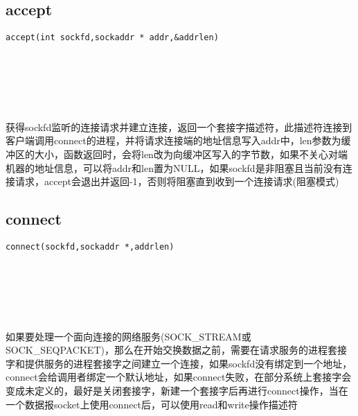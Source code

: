\documentclass[10pt,a4paper]{article}
\begin{document}
\subsection{accept}
\begin{spacing}{2.0}
\lstset{language=C,numbers=none}
\begin{lstlisting}
accept(int sockfd,sockaddr * addr,&addrlen)
\end{lstlisting}
{\large\color[rgb]{0.2,0.4,0.6}{sockfd:}} \\
{\large\color[rgb]{0.2,0.4,0.6}{addr:}} \\
{\large\color[rgb]{0.2,0.4,0.6}{\&addrlen:}}
\paragraph{ \ \ }获得sockfd监听的连接请求并建立连接，返回一个套接字描述符，此描述符连接到客户端调用connect的进程，并将请求连接端的地址信息写入addr中，len参数为缓冲区的大小，函数返回时，会将len改为向缓冲区写入的字节数，如果不关心对端机器的地址信息，可以将addr和len置为NULL，如果sockfd是非阻塞且当前没有连接请求，accept会退出并返回-1，否则将阻塞直到收到一个连接请求(阻塞模式)
\end{spacing}

\subsection{connect}
\begin{spacing}{2.0}
\lstset{language=C,numbers=none}
\begin{lstlisting}
connect(sockfd,sockaddr *,addrlen)
\end{lstlisting}
{\large\color[rgb]{0.2,0.4,0.6}{sockfd:}} \\
{\large\color[rgb]{0.2,0.4,0.6}{*:}} \\
{\large\color[rgb]{0.2,0.4,0.6}{addrlen:}}
\paragraph{ \ \ }如果要处理一个面向连接的网络服务(SOCK\_STREAM或SOCK\_SEQPACKET)，那么在开始交换数据之前，需要在请求服务的进程套接字和提供服务的进程套接字之间建立一个连接，如果sockfd没有绑定到一个地址，connect会给调用者绑定一个默认地址，如果connect失败，在部分系统上套接字会变成未定义的，最好是关闭套接字，新建一个套接字后再进行connect操作，当在一个数据报socket上使用connect后，可以使用read和write操作描述符
\end{spacing}
\end{document}
